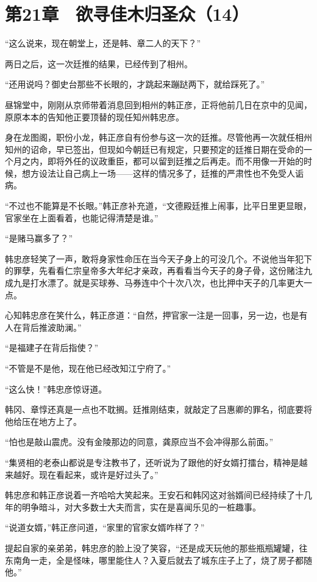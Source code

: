 \section{第21章　欲寻佳木归圣众（14）}

“这么说来，现在朝堂上，还是韩、章二人的天下？”

两日之后，这一次廷推的结果，已经传到了相州。

“还用说吗？御史台那些不长眼的，才跳起来蹦跶两下，就给踩死了。”

昼锦堂中，刚刚从京师带着消息回到相州的韩正彦，正将他前几日在京中的见闻，原原本本的告知他正要顶替的现任知州韩忠彦。

身在龙图阁，职份小龙，韩正彦自有份参与这一次的廷推。尽管他再一次就任相州知州的诏命，早已签出，但现如今朝廷已有规定，只要预定的廷推日期在受命的一个月之内，即将外任的议政重臣，都可以留到廷推之后再走。而不用像一开始的时候，想方设法让自己病上一场——这样的情况多了，廷推的严肃性也不免受人诟病。

“不过也不能算是不长眼。”韩正彦补充道，“文德殿廷推上闹事，比平日里更显眼，官家坐在上面看着，也能记得清楚是谁。”

“是赌马赢多了？”

韩忠彦轻笑了一声，敢将身家性命压在当今天子身上的可没几个。不说他当年犯下的罪孽，先看看仁宗皇帝多大年纪才亲政，再看看当今天子的身子骨，这份赌注九成九是打水漂了。就是买球券、马券连中个十次八次，也比押中天子的几率更大一点。

心知韩忠彦在笑什么，韩正彦道：“自然，押官家一注是一回事，另一边，也是有人在背后推波助澜。”

“是福建子在背后指使？”

“不管是不是他，现在他已经改知江宁府了。”

“这么快！”韩忠彦惊讶道。

韩冈、章惇还真是一点也不耽搁。廷推刚结束，就敲定了吕惠卿的罪名，彻底要将他给压在地方上了。

“怕也是敲山震虎。没有金陵那边的同意，龚原应当不会冲得那么前面。”

“集贤相的老泰山都说是专注教书了，还听说为了跟他的好女婿打擂台，精神是越来越好。现在看起来，或许是好过头了。”

韩忠彦和韩正彦说着一齐哈哈大笑起来。王安石和韩冈这对翁婿间已经持续了十几年的明争暗斗，对大多数士大夫而言，实在是喜闻乐见的一桩趣事。

“说道女婿，”韩正彦问道，“家里的官家女婿咋样了？”

提起自家的亲弟弟，韩忠彦的脸上没了笑容，“还是成天玩他的那些瓶瓶罐罐，往东南角一走，全是怪味，哪里能住人？入夏后就去了城东庄子上了，烧了房子都随他。”


